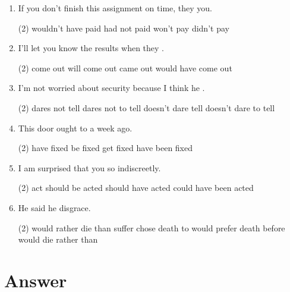 \begin{enumerate}
\item If you don't finish this assignment on time, they \ttu you.
  \begin{tasks}(2)
    \task wouldn't have paid
    \task had not paid
    \task won't pay
    \task didn't pay
  \end{tasks}

\item I'll let you know the results when they \ttu.
  \begin{tasks}(2)
    \task come out
    \task will come out
    \task came out
    \task would have come out
  \end{tasks}

\item I'm not worried about security because I think he \ttu.
  \begin{tasks}(2)
    \task dares not tell
    \task dares not to tell
    \task doesn't dare tell
    \task doesn't dare to tell
  \end{tasks}

\item This door ought to \ttu a week ago.
  \begin{tasks}(2)
    \task have fixed
    \task be fixed
    \task get fixed
    \task have been fixed
  \end{tasks}

\item I am surprised that you \ttu so indiscreetly.
  \begin{tasks}(2)
    \task act
    \task should be acted
    \task should have acted
    \task could have been acted
  \end{tasks}

\item He said he \ttu disgrace.
  \begin{tasks}(2)
    \task would rather die than suffer
    \task chose death to
    \task would prefer death before
    \task would die rather than
  \end{tasks}

\end{enumerate}

\section{Answer}

